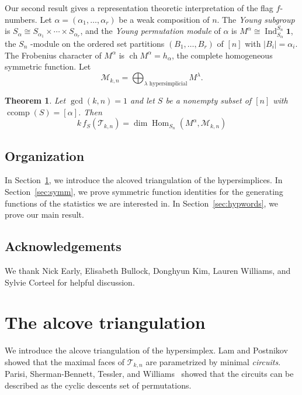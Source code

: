 \documentclass[12pt,reqno]{amsart}
\theoremstyle{plain}
\newtheorem{theorem}{Theorem}[section]
\theoremstyle{definition}
\newcommand{\M}{\mathcal{M}}
\newcommand{\Tri}{\mathcal{T}_{k,n}}
\newcommand{\triv}{\mathbf{1}}
\DeclareMathOperator{\ccomp}{ccomp}
\DeclareMathOperator{\Ind}{Ind}
\DeclareMathOperator{\Hom}{Hom}
\DeclareMathOperator{\ch}{ch}
\begin{document}
Our second result gives a representation theoretic interpretation of the flag $ f $-numbers. Let $ \alpha =
(\alpha_1,\dots,\alpha_r) $ be a weak composition of $ n $. The \emph{Young subgroup} is $ S_\alpha \cong S_{\alpha_1}
\times \cdots \times S_{\alpha_r} $, and the \emph{Young permutation module} of $\alpha$ is $ M^\alpha \cong
\Ind_{S_\alpha}^{S_n} \triv $, the $ S_n $ -module on the ordered set partitions $ (B_1,\dots,B_r) $ of $ [n] $ with $
|B_i| = \alpha_i $. The Frobenius character of $ M^\alpha $ is $ \ch M^{\alpha} = h_\alpha $, the complete homogeneous
symmetric function. Let
\begin{equation}
	\label{eq:Mkn} \M_{k,n} = \bigoplus_{\lambda \text{ hypersimplicial}} M^\lambda.
\end{equation}
\begin{theorem}\label{thm:repmain}
	Let $ \gcd(k,n)=1 $ and let $ S $
	be a nonempty subset of $ [n] $ with $\ccomp(S) = [\alpha]$. Then
	\begin{equation}
		k \, f_S(\Tri) = \dim \Hom_{S_n}(M^{\alpha}, \M_{k,n})
	\end{equation}
\end{theorem}

\subsection*{Organization}
In Section~\ref{sec:triangulation}, we introduce the alcoved triangulation of the hypersimplices. In
Section~\ref{sec:symm}, we prove symmetric function identities for the generating functions of the statistics we are
interested in. In Section~\ref{sec:hypwords}, we prove our main result.
\subsection*{Acknowledgements}
We thank Nick Early, Elisabeth Bullock, Donghyun Kim, Lauren Williams, and Sylvie Corteel for helpful discussion.

\section{The alcove triangulation}\label{sec:triangulation}

We introduce the alcove triangulation of the hypersimplex. Lam and Postnikov~\cite{alcove1} showed that the maximal
faces of $ \Tri $ are parametrized by minimal \emph{circuits}. Parisi, Sherman-Bennett, Tessler, and
Williams~\cite{magicnumber} showed that the circuits can be described as the cyclic descents set of permutations.
\end{document}
